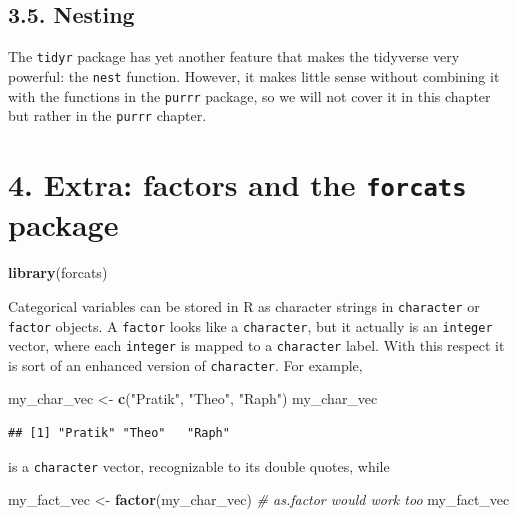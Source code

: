 \documentclass[]{book}
\newenvironment{Shaded}{}{}
\newcommand{\CommentTok}[1]{\textcolor[rgb]{0.38,0.63,0.69}{\textit{#1}}}
\newcommand{\KeywordTok}[1]{\textcolor[rgb]{0.00,0.44,0.13}{\textbf{#1}}}
\newcommand{\NormalTok}[1]{#1}
\newcommand{\StringTok}[1]{\textcolor[rgb]{0.25,0.44,0.63}{#1}}
\begin{document}
\hypertarget{nesting}{%
\subsection{3.5. Nesting}\label{nesting}}

The \texttt{tidyr} package has yet another feature that makes the tidyverse very powerful: the \texttt{nest} function. However, it makes little sense without combining it with the functions in the \texttt{purrr} package, so we will not cover it in this chapter but rather in the \texttt{purrr} chapter.

\hypertarget{extra-factors-and-the-forcats-package}{%
\section{\texorpdfstring{4. Extra: factors and the \texttt{forcats} package}{4. Extra: factors and the forcats package}}\label{extra-factors-and-the-forcats-package}}

\begin{Shaded}
\begin{Highlighting}[]
\KeywordTok{library}\NormalTok{(forcats)}
\end{Highlighting}
\end{Shaded}

Categorical variables can be stored in R as character strings in \texttt{character} or \texttt{factor} objects. A \texttt{factor} looks like a \texttt{character}, but it actually is an \texttt{integer} vector, where each \texttt{integer} is mapped to a \texttt{character} label. With this respect it is sort of an enhanced version of \texttt{character}. For example,

\begin{Shaded}
\begin{Highlighting}[]
\NormalTok{my_char_vec <-}\StringTok{ }\KeywordTok{c}\NormalTok{(}\StringTok{"Pratik"}\NormalTok{, }\StringTok{"Theo"}\NormalTok{, }\StringTok{"Raph"}\NormalTok{)}
\NormalTok{my_char_vec}
\end{Highlighting}
\end{Shaded}

\begin{verbatim}
## [1] "Pratik" "Theo"   "Raph"
\end{verbatim}

is a \texttt{character} vector, recognizable to its double quotes, while

\begin{Shaded}
\begin{Highlighting}[]
\NormalTok{my_fact_vec <-}\StringTok{ }\KeywordTok{factor}\NormalTok{(my_char_vec) }\CommentTok{# as.factor would work too}
\NormalTok{my_fact_vec}
\end{Highlighting}
\end{Shaded}
\end{document}
